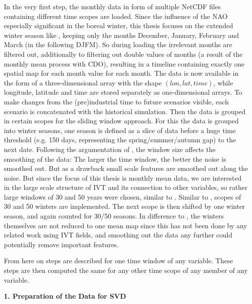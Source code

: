 In the very first step, the monthly data in form of multiple NetCDF files containing different time scopes are loaded. 
Since the influence of the NAO especially significant in the boreal winter, this thesis focuses on the extended winter season like \cite{vietinghoff_visual_2021}, keeping only the months December, January, February and March (in the following DJFM). 
So during loading the irrelevant months are filtered out, additionally to filtering out double values of months (a result of the monthly mean process with CDO), resulting in a timeline containing exactly one spatial map for each month value for each month. 
The data is now available in the form of a three-dimensional array with the shape $(lon, lat, time)$, while longitude, latitude and time are stored separately as one-dimensional arrays. 
To make changes from the (pre)industrial time to future scenarios visible, each scenario is concatenated with the historical simulation. 
Then the data is grouped in certain scopes for the sliding window approach. 
For this the data is grouped into winter seasons, one season is defined as a slice of data before a huge time threshold (e.g. 150 days, representing the spring/summer/autumn gap) to the next date. 
Following the argumentation of , the window size affects the smoothing of the data: The larger the time window, the better the noise is smoothed out.
But as a drawback small scale features are smoothed out along the noise. 
But since the focus of this thesis is monthly mean data, we are interested in the large scale structure of IVT and its connection to other variables, so rather large windows of 30 and 50 years were chosen, similar to .  
Similar to \citeauthor{vietinghoff_visual_2021}, scopes of 30 and 50 winters are implemented.  
The next scope is then shifted by one winter season, and again counted for 30/50 seasons. 
In difference to \cite{vietinghoff_visual_2021}, the winters themselves are not reduced to one mean map since this has not been done by any related work using IVT fields, and smoothing out the data any further could potentially remove important features. 


From here on steps are described for one time window of any variable. 
These steps are then computed the same for any other time scope of any member of any variable. 



\textbf{1. Preparation of the Data for SVD}

